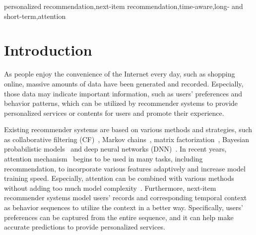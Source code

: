 \documentclass[preprint,12pt]{elsarticle}
\begin{document}
\begin{sloppypar}
\begin{frontmatter}
\begin{keyword}
personalized recommendation\sep next-item recommendation\sep time-aware\sep long- and short-term\sep attention




\end{keyword}

\end{frontmatter}



\section{Introduction}

As people enjoy the convenience of the Internet every day, such as shopping online, massive amounts of data have been generated and recorded. Especially, those data may indicate important information, such as users' preferences and behavior patterns, which can be utilized by recommender systems \cite{rendle2009bpr, wu2017recurrent} to provide personalized services or contents for users and promote their experience. 

Existing recommender systems are based on various methods and strategies, such as collaborative filtering (CF)~\cite{chen2020deep, qin2020sequential}, Markov chains~\cite{rendle2010factorizing, he2016fusing}, matrix factorization~\cite{chen2020deep, khan2020enriching}, Bayesian probabilistic models~\cite{rendle2009bpr, morise2019bayesian} and deep neural networks (DNN)~\cite{he2016vbpr, zhou2018personalized}. In recent years, attention mechanism~\cite{vaswani2017attention, cao2020position} begins to be used in many tasks, including recommendation, to incorporate various features adaptively and increase model training speed. Especially, attention can be combined with various methods without adding too much model complexity~\cite{cheng2018neural}. Furthermore, next-item recommender systems model users' records and corresponding temporal context as behavior sequences to utilize the context in a better way. Specifically, users' preferences can be captured from the entire sequence, and it can help make accurate predictions to provide personalized services.


\end{sloppypar}
\end{document}
